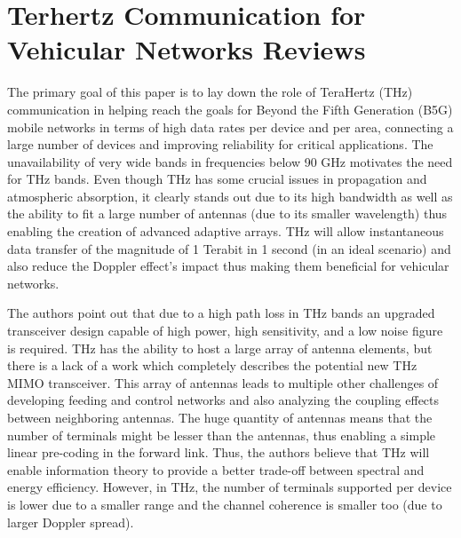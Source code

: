 \documentclass[12pt, letterpaper]{article}
\begin{document}
\section{Terhertz Communication for Vehicular Networks Reviews \cite{mumtaz2017terahertz}} 
\par
The primary goal of this paper is to lay down the role of TeraHertz (THz) communication in helping reach the goals for Beyond the Fifth Generation (B5G) mobile networks in terms of high data rates per device and per area, connecting a large number of devices and improving reliability for critical applications. The unavailability of very wide bands in frequencies below 90 GHz motivates the need for THz bands. Even though THz has some crucial issues in propagation and atmospheric absorption, it clearly stands out due to its high bandwidth as well as the ability to fit a large number of antennas (due to its smaller wavelength) thus enabling the creation of advanced adaptive arrays. THz will allow instantaneous data transfer of the magnitude of 1 Terabit in 1 second (in an ideal scenario) and also reduce the Doppler effect's impact thus making them beneficial for vehicular networks.
\par
The authors point out that due to a high path loss in THz bands an upgraded transceiver design capable of high power, high sensitivity, and a low noise figure is required. THz has the ability to host a large array of antenna elements, but there is a lack of a work which completely describes the potential new THz MIMO transceiver. This array of antennas leads to multiple other challenges of developing feeding and control networks and also analyzing the coupling effects between neighboring antennas. The huge quantity of antennas means that the number of terminals might be lesser than the antennas, thus enabling a simple linear pre-coding in the forward link. Thus, the authors believe that THz will enable information theory to provide a better trade-off between spectral and energy efficiency. However, in THz, the number of terminals supported per device is lower due to a smaller range and the channel coherence is smaller too (due to larger Doppler spread). 
\par
\end{document}
